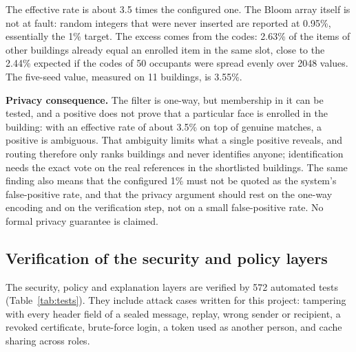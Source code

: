 \documentclass[12pt,a4paper,oneside]{report}
\begin{document}
The effective rate is about 3.5 times the configured one. The Bloom array itself is not at fault: random integers that were never inserted are reported at 0.95\%, essentially the 1\% target. The excess comes from the codes: 2.63\% of the items of other buildings already equal an enrolled item in the same slot, close to the 2.44\% expected if the codes of 50 occupants were spread evenly over 2048 values. The five-seed value, measured on 11 buildings, is 3.55\%.

\textbf{Privacy consequence.} The filter is one-way, but membership in it can be tested, and a positive does not prove that a particular face is enrolled in the building: with an effective rate of about 3.5\% on top of genuine matches, a positive is ambiguous. That ambiguity limits what a single positive reveals, and routing therefore only ranks buildings and never identifies anyone; identification needs the exact vote on the real references in the shortlisted buildings. The same finding also means that the configured 1\% must not be quoted as the system's false-positive rate, and that the privacy argument should rest on the one-way encoding and on the verification step, not on a small false-positive rate. No formal privacy guarantee is claimed.

\subsection{Verification of the security and policy layers}\label{sec:res-security}
The security, policy and explanation layers are verified by 572 automated tests (Table~\ref{tab:tests}). They include attack cases written for this project: tampering with every header field of a sealed message, replay, wrong sender or recipient, a revoked certificate, brute-force login, a token used as another person, and cache sharing across roles.
\end{document}
